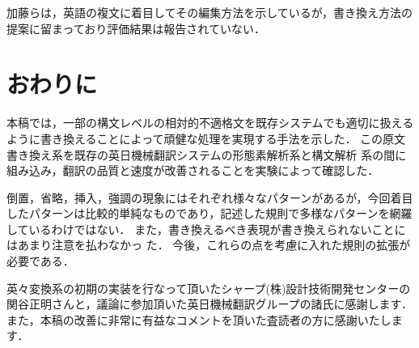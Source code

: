 加藤らは，英語の複文に着目してその編集方法を示しているが，書き換え方法の
提案に留まっており評価結果は報告されていない．

\section{おわりに}

本稿では，一部の構文レベルの相対的不適格文を既存システムでも適切に扱える
ように書き換えることによって頑健な処理を実現する手法を示した．
この原文書き換え系を既存の英日機械翻訳システムの形態素解析系と構文解析
系の間に組み込み，翻訳の品質と速度が改善されることを実験によって確認した．

倒置，省略，挿入，強調の現象にはそれぞれ様々なパターンがあるが，今回着目
したパターンは比較的単純なものであり，記述した規則で多様なパターンを網羅
しているわけではない．
また，書き換えるべき表現が書き換えられないことにはあまり注意を払わなかっ
た．
今後，これらの点を考慮に入れた規則の拡張が必要である．

\acknowledgment

英々変換系の初期の実装を行なって頂いたシャープ(株)設計技術開発センターの
関谷正明さんと，議論に参加頂いた英日機械翻訳グループの諸氏に感謝します．
また，本稿の改善に非常に有益なコメントを頂いた査読者の方に感謝いたします．




\newpage
\appendix

